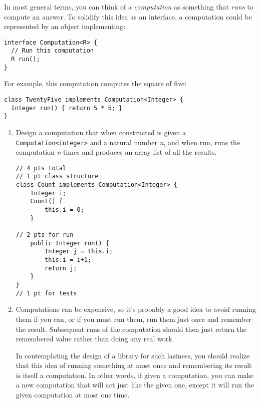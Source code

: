 \documentclass[12pt]{article}                   %
\def\pts#1{\marginpar{\footnotesize \raggedright  \fbox{#1 {\sc Points}}}}
\newenvironment{solution}{\color{Red}}{}
\begin{document}
\begin{problem} \pts{18}

In most general terms, you can think of a \emph{computation} as something that
\emph{runs} to compute an answer.  To solidify this idea as an interface, a
computation could be represented by an object implementing:

\begin{verbatim}
interface Computation<R> {
  // Run this computation
  R run();
}
\end{verbatim}

\noindent
For example, this computation computes the square of five:

\begin{verbatim}
class TwentyFive implements Computation<Integer> {
  Integer run() { return 5 * 5; }
}
\end{verbatim}

\begin{enumerate}

\item Design a computation that when constructed is given a
 \texttt{Computation<Integer>} and a natural number \emph{n}, and when
 run, runs the computation \emph{n} times and produces an array list
of all the results.

\begin{solution}
\begin{verbatim}
// 4 pts total
// 1 pt class structure
class Count implements Computation<Integer> {
    Integer i;
    Count() {
        this.i = 0;
    }

// 2 pts for run
    public Integer run() {
        Integer j = this.i;
        this.i = i+1;
        return j;
    }      
}
// 1 pt for tests
\end{verbatim}
\end{solution}

\newpage
\item

Computations can be expensive, so it's probably a good idea to avoid
 running them if you can, or if you must run them, run them just once
 and remember the result. Subsequent runs of the computation should
 then just return the remembered value rather than doing any real
 work.

In contemplating the design of a library for such laziness, you should
 realize that this idea of running something at most once and
 remembering its result is itself a computation.  In other words, if
 given a computation, you can make a new computation that will act
 just like the given one, except it will run the given computation at
 most one time.


\end{enumerate}
\end{problem}
\end{document}
